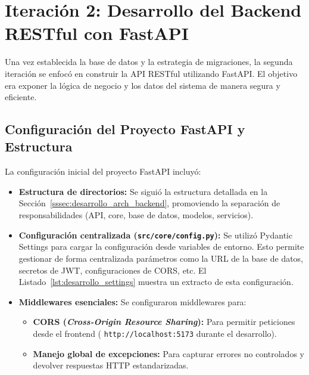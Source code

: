 \section{Iteración 2: Desarrollo del Backend RESTful con FastAPI}
\label{sec:desarrollo_iter2_backend}

Una vez establecida la base de datos y la estrategia de migraciones, la segunda iteración se enfocó en construir la API RESTful utilizando FastAPI. El objetivo era exponer la lógica de negocio y los datos del sistema de manera segura y eficiente.

\subsection{Configuración del Proyecto FastAPI y Estructura}
\label{ssec:desarrollo_iter2_config}

La configuración inicial del proyecto FastAPI incluyó:
\begin{itemize}[leftmargin=*]
  \item \textbf{Estructura de directorios:} Se siguió la estructura detallada en la Sección~\ref{sssec:desarrollo_arch_backend}, promoviendo la separación de responsabilidades (API, core, base de datos, modelos, servicios).
  \item \textbf{Configuración centralizada (\texttt{src/core/config.py}):} Se utilizó Pydantic Settings para cargar la configuración desde variables de entorno. Esto permite gestionar de forma centralizada parámetros como la URL de la base de datos, secretos de JWT, configuraciones de CORS, etc. El Listado~\ref{lst:desarrollo_settings} muestra un extracto de esta configuración.
  \item \textbf{Middlewares esenciales:} Se configuraron middlewares para:
        \begin{itemize}
            \item \textbf{CORS (\emph{Cross-Origin Resource Sharing}):} Para permitir peticiones desde el frontend ( \texttt{http://localhost:5173} durante el desarrollo).
            \item \textbf{Manejo global de excepciones:} Para capturar errores no controlados y devolver respuestas HTTP estandarizadas.
        \end{itemize}
\end{itemize}

